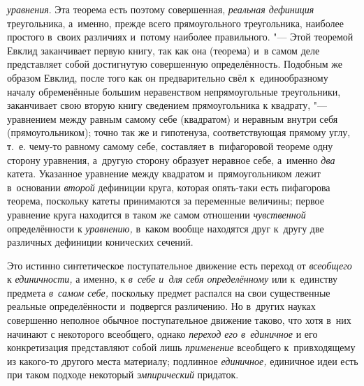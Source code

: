 {\em уравнения}. Эта
теорема есть поэтому совершенная,
{\em реальная дефиниция}
треугольника, а~именно, прежде всего прямоугольного
треугольника, наиболее простого в~своих различиях и~потому наиболее
правильного. "--- Этой теоремой Евклид заканчивает первую
книгу, так как она (теорема) и~в самом деле представляет собой достигнутую
совершенную определённость. Подобным же образом Евклид, после того как он
предварительно свёл к~единообразному
началу
обременённые большим неравенством непрямоугольные
треугольники, заканчивает свою вторую книгу сведением прямоугольника к
квадрату, "--- уравнением между равным самому себе (квадратом)
и
неравным внутри себя (прямоугольником); точно так же и
гипотенуза, соответствующая прямому углу, т.~е. чему-то равному самому
себе, составляет в~пифагоровой теореме одну сторону уравнения, а~другую
сторону образует неравное себе, а~именно
{\em два} катета.
Указанное уравнение между квадратом и~прямоугольником лежит в~основании
{\em второй} дефиниции
круга, которая опять-таки есть пифагорова теорема, поскольку катеты
принимаются за переменные величины; первое уравнение круга находится в
таком же самом отношении
{\em чувственной}
определённости к
{\em уравнению,} в~каком
вообще находятся друг к~другу две различных дефиниции конических сечений.

Это истинно синтетическое поступательное движение есть переход
от {\em всеобщего} к
{\em единичности,} а
именно, к {\em в~себе и~для себя
определённому} или к~единству предмета
{\em в~самом себе,}
поскольку предмет распался на свои существенные реальные
определённости и~подвергся различению. Но в~других науках совершенно
неполное обычное поступательное движение таково, что хотя в~них начинают с
некоторого всеобщего, однако
{\em переход его в~единичное}
и его конкретизация представляют собой лишь
{\em применение}
всеобщего к~привходящему из какого-то другого места
материалу; подлинное {\em единичное,}
единичное идеи есть при таком подходе некоторый
{\em эмпирический} придаток.

